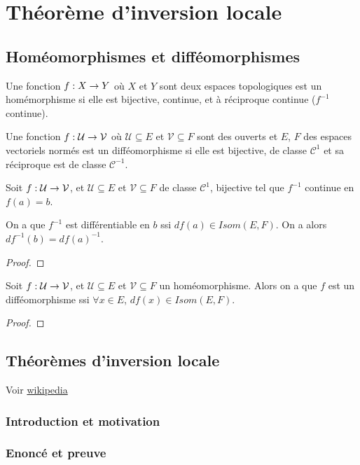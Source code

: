 \chapter{Théorème d'inversion locale}

\section{Homéomorphismes et difféomorphismes}

\begin{definition}
\label{definition_homeomorphisme}
	Une fonction $f : X \rightarrow Y$ où $X$ et $Y$ sont deux espaces
	topologiques est un homémorphisme si elle est bijective, continue, et à
	réciproque continue ($f^{-1}$ continue).
\end{definition}

\begin{definition}
\label{definition_diffeomorphism}
Une fonction $f : \mathcal{U} \rightarrow \mathcal{V}$ où $\mathcal{U}
\subseteq E$ et $\mathcal{V} \subseteq F$ sont des ouverts et $E$, $F$ des espaces
	vectoriels normés est un difféomorphisme si elle est bijective,
	de classe $\mathcal{C}^{1}$ et sa réciproque est de classe
	$\mathcal{C}^{-1}$.
\end{definition}

\begin{proposition}
	Soit $f : \mathcal{U} \rightarrow \mathcal{V}$, et $\mathcal{U} \subseteq
	E$ et $\mathcal{V} \subseteq F$ de classe $\mathcal{C}^{1}$, bijective tel
	que $f^{-1}$ continue en $f(a) = b$.

	On a que $f^{-1}$ est différentiable en $b$ ssi $df(a) \in Isom(E, F)$. On a
	alors $df^{-1}(b) = {df(a)}^{-1}$.
\end{proposition}

\ifdefined\outputproof
\begin{proof}

\end{proof}
\fi

\begin{proposition}
	Soit $f : \mathcal{U} \rightarrow \mathcal{V}$, et $ \mathcal{U} \subseteq
	E$ et $\mathcal{V} \subseteq F$ un homéomorphisme. Alors on a que $f$ est un
	difféomorphisme ssi $\forall x \in E$, $df(x) \in Isom(E, F)$.
\end{proposition}

\ifdefined\outputproof
\begin{proof}

\end{proof}
\fi

\section{Théorèmes d'inversion locale}
	Voir
	\href{http://fr.wikipedia.org/wiki/Th%C3%A9or%C3%A8me_d%27inversion_locale}{wikipedia}

\subsection{Introduction et motivation}

\subsection{Enoncé et preuve}

\begin{theorem}
	\label{theorem:local_inversion}
\end{theorem}
